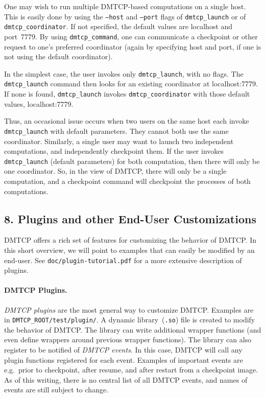 \documentclass{article}
\begin{document}
One may wish to run multiple DMTCP-based computations on a single host.
This is easily done by using the {\tt --host} and {\tt --port} flags
of {\tt dmtcp\_launch} or of {\tt dmtcp\_coordinator}.  If not specified,
the default values are localhost and port~7779.  By using {\tt dmtcp\_command},
one can communicate a checkpoint or other request to one's
preferred coordinator (again by specifying host and port, if one is
not using the default coordinator).

In the simplest case, the user invokes only {\tt dmtcp\_launch}, with no
flags.  The {\tt dmtcp\_launch} command then looks for an existing
coordinator at localhost:7779.  If none is found, {\tt dmtcp\_launch}
invokes {\tt dmtcp\_coordinator} with those default values, localhost:7779.

Thus, an occasional issue occurs when two users on the same host each
invoke {\tt dmtcp\_launch} with default parameters.  They cannot both use
the same coordinator.  Similarly, a single user may want to launch two
independent computations, and independently checkpoint them.  If the user
invokes {\tt dmtcp\_launch} (default parameters) for both computation,
then there will only be one coordinator.  So, in the view of DMTCP,
there will only be a single computation, and a checkpoint command will
checkpoint the processes of both computations.

\subsection*{8. Plugins and other End-User Customizations}

DMTCP offers a rich set of features for customizing the behavior of
DMTCP.  In this short overview, we will point to examples that can
easily be modified by an end-user.  See {\tt doc/plugin-tutorial.pdf}
for a more extensive description of plugins.

\paragraph{DMTCP Plugins.}

{\em DMTCP plugins\/} are the most general way to customize DMTCP.  Examples
are in {\tt DMTCP\_ROOT/test/plugin/}.  A dynamic library~({\tt *.so})
file is created to modify the behavior of DMTCP.  The library can
write additional wrapper functions (and even define wrappers around
previous wrapper functions).  The library can also register
to be notified of {\em DMTCP events}.  In this case, DMTCP will
call any plugin functions registered for each event.
Examples of important events are
\hbox{e.g.}~prior to checkpoint, after resume, and after restart
from a checkpoint image.  As of this writing, there is no central
list of all DMTCP events, and names of events are still subject to change.
\end{document}

